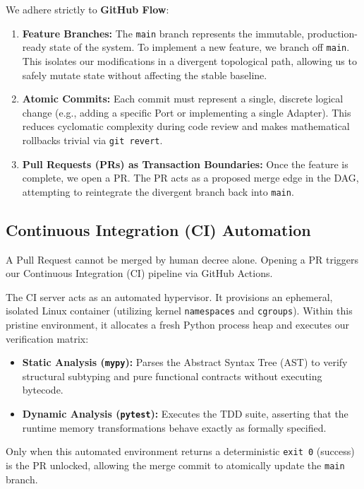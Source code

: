 We adhere strictly to \textbf{GitHub Flow}:
\begin{enumerate}
    \item \textbf{Feature Branches:} The \texttt{main} branch represents the immutable, production-ready state of the system. To implement a new feature, we branch off \texttt{main}. This isolates our modifications in a divergent topological path, allowing us to safely mutate state without affecting the stable baseline.
    \item \textbf{Atomic Commits:} Each commit must represent a single, discrete logical change (e.g., adding a specific Port or implementing a single Adapter). This reduces cyclomatic complexity during code review and makes mathematical rollbacks trivial via \texttt{git revert}.
    \item \textbf{Pull Requests (PRs) as Transaction Boundaries:} Once the feature is complete, we open a PR. The PR acts as a proposed merge edge in the DAG, attempting to reintegrate the divergent branch back into \texttt{main}.
\end{enumerate}

\subsection*{Continuous Integration (CI) Automation}
A Pull Request cannot be merged by human decree alone. Opening a PR triggers our Continuous Integration (CI) pipeline via GitHub Actions.

The CI server acts as an automated hypervisor. It provisions an ephemeral, isolated Linux container (utilizing kernel \texttt{namespaces} and \texttt{cgroups}). Within this pristine environment, it allocates a fresh Python process heap and executes our verification matrix:
\begin{itemize}
    \item \textbf{Static Analysis (\texttt{mypy}):} Parses the Abstract Syntax Tree (AST) to verify structural subtyping and pure functional contracts without executing bytecode.
    \item \textbf{Dynamic Analysis (\texttt{pytest}):} Executes the TDD suite, asserting that the runtime memory transformations behave exactly as formally specified.
\end{itemize}
Only when this automated environment returns a deterministic \texttt{exit 0} (success) is the PR unlocked, allowing the merge commit to atomically update the \texttt{main} branch.
